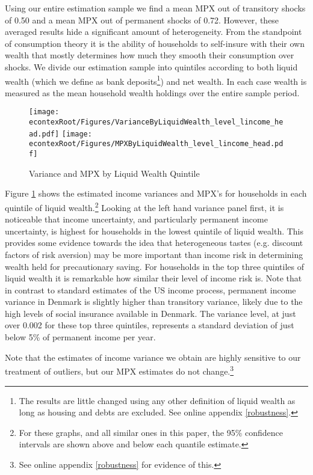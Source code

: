 \documentclass[titlepage]{\econtex}\newcommand{\texname}{ConsumptionHeterogeneity}
\begin{document}
Using our entire estimation sample we find a mean MPX out of transitory shocks of 0.50 and a mean MPX out of permanent shocks of 0.72. However, these averaged results hide a significant amount of heterogeneity. From the standpoint of consumption theory it is the ability of households to self-insure with their own wealth that mostly determines how much they smooth their consumption over shocks. We divide our estimation sample into quintiles according to both liquid wealth (which we define as bank deposits\footnote{The results are little changed using any other definition of liquid wealth as long as housing and debts are excluded. See online appendix \ref{robustness}.}) and net wealth. In each case wealth is measured as the mean household wealth holdings over the entire sample period.
\begin{figure}
	\centering
	\texttt{[image: \\econtexRoot/Figures/VarianceByLiquidWealth\_level\_lincome\_head.pdf]}
	\centering
	\texttt{[image: \\econtexRoot/Figures/MPXByLiquidWealth\_level\_lincome\_head.pdf]}
	\caption{Variance and MPX by Liquid Wealth Quintile}
	\label{fig:MPXByLiquidWealth}
\end{figure}

Figure \ref{fig:MPXByLiquidWealth} shows the estimated income variances and MPX's for households in each quintile of liquid wealth.\footnote{For these graphs, and all similar ones in this paper, the 95\% confidence intervals are shown above and below each quantile estimate.} Looking at the left hand variance panel first, it is noticeable that income uncertainty, and particularly permanent income uncertainty, is highest for households in the lowest quintile of liquid wealth. This provides some evidence towards the idea that heterogeneous tastes (e.g. discount factors of risk aversion) may be more important than income risk in determining wealth held for precautionary saving. For households in the top three quintiles of liquid wealth it is remarkable how similar their level of income risk is. Note that in contrast to standard estimates of the US income process, permanent income variance in Denmark is slightly higher than transitory variance, likely due to the high levels of social insurance available in Denmark. The variance level, at just over 0.002 for these top three quintiles, represents a standard deviation of just below 5\% of permanent income per year.

Note that the estimates of income variance we obtain are highly sensitive to our treatment of outliers, but our MPX estimates do not change.\footnote{See online appendix \ref{robustness} for evidence of this.}
\end{document}
